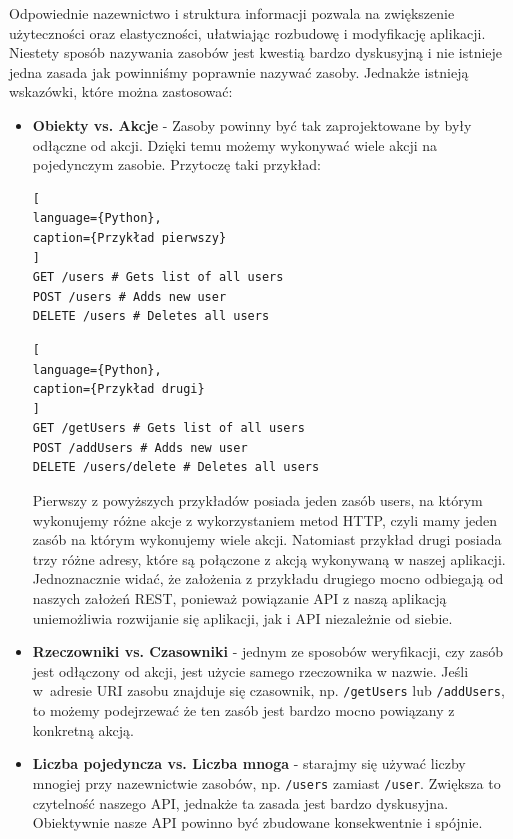 \documentclass[oneside,polski,logo,indent]{amuthesis}
\begin{document}
Odpowiednie nazewnictwo i struktura informacji pozwala na zwiększenie użyteczności oraz elastyczności, ułatwiając rozbudowę i modyfikację aplikacji. Niestety sposób nazywania zasobów jest kwestią bardzo dyskusyjną i nie istnieje jedna zasada jak powinniśmy poprawnie nazywać zasoby. Jednakże istnieją wskazówki, które można zastosować:\newline
\begin{itemize}
\item \textbf{Obiekty vs. Akcje} - Zasoby powinny być tak zaprojektowane by były odłączne od akcji. Dzięki temu możemy wykonywać wiele akcji na pojedynczym zasobie. Przytoczę taki przykład:\newline

\begin{lstlisting}[
language={Python},
caption={Przykład pierwszy}
]
GET /users # Gets list of all users
POST /users # Adds new user
DELETE /users # Deletes all users
\end{lstlisting}

\begin{lstlisting}[
language={Python},
caption={Przykład drugi}
]
GET /getUsers # Gets list of all users
POST /addUsers # Adds new user
DELETE /users/delete # Deletes all users
\end{lstlisting}

Pierwszy z powyższych przykładów posiada jeden zasób users, na którym wykonujemy różne akcje z wykorzystaniem metod HTTP, czyli mamy jeden zasób na którym wykonujemy wiele akcji. Natomiast przykład drugi posiada trzy różne adresy, które są połączone z akcją wykonywaną w naszej aplikacji. Jednoznacznie widać, że założenia z przykładu drugiego mocno odbiegają od naszych założeń REST, ponieważ powiązanie API z naszą aplikacją uniemożliwia rozwijanie się aplikacji, jak i API niezależnie od siebie.\newline
\item \textbf{Rzeczowniki vs. Czasowniki} - jednym ze sposobów weryfikacji, czy zasób jest odłączony od akcji, jest użycie samego rzeczownika w nazwie. Jeśli w~adresie URI zasobu znajduje się czasownik, np. \texttt{/getUsers} lub \texttt{/addUsers}, to możemy podejrzewać że ten zasób jest bardzo mocno powiązany z konkretną akcją.\newline
\item \textbf{Liczba pojedyncza vs. Liczba mnoga} - starajmy się używać liczby mnogiej przy nazewnictwie zasobów, np. \texttt{/users} zamiast \texttt{/user}. Zwiększa to czytelność naszego API, jednakże ta zasada jest bardzo dyskusyjna. Obiektywnie nasze API powinno być zbudowane konsekwentnie i spójnie. 
\end{itemize}
\end{document}
